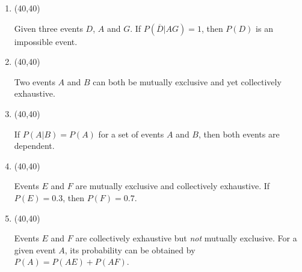 \documentclass[11pt,twoside]{article}
\numberwithin{equation}{section}
\newcommand{\?}{\stackrel{?}{=}}
\newcommand{\ol}{\overline}
\newcommand{\gr}{\color{green!40!black}}
\begin{document}
\begin{enumerate}[\bf (i)]
\item \hfill
  \begin{minipage}{.1\linewidth}
    \framebox(40,40){ \gr  }
  \end{minipage}\quad
  \begin{minipage}{.85\linewidth}
    Given three events $D$, $A$ and $G$. If $P(\ol{D}|AG) = 1$, then $P(D)$ is an impossible event.
 
  \end{minipage}

    \smallskip
  
\item \hfill
  \begin{minipage}{.1\linewidth}
    \framebox(40,40){\gr  }
  \end{minipage}\quad
  \begin{minipage}{.85\linewidth}
   Two events $A$ and $B$ can both be mutually exclusive and yet collectively exhaustive.
  \end{minipage}

  \smallskip
  
\item \hfill
  \begin{minipage}{.1\linewidth}
    \framebox(40,40){\gr  }
  \end{minipage}\quad
  \begin{minipage}{.85\linewidth}
    If $P(A|B) = P(A)$ for a set of events $A$ and $B$, then both events are  dependent.
  \end{minipage}

  \smallskip
  
\item \hfill
  \begin{minipage}{.1\linewidth}
    \framebox(40,40){\gr  }
  \end{minipage}\quad
  \begin{minipage}{.85\linewidth}
    Events $E$ and $F$ are mutually exclusive and collectively exhaustive. If $P(E) = 0.3$, then $P(F) = 0.7$.
   \end{minipage}

  \smallskip

  \item \hfill
  \begin{minipage}{.1\linewidth}
    \framebox(40,40){\gr  }
  \end{minipage}\quad
  \begin{minipage}{.85\linewidth}
    Events $E$ and $F$ are  collectively exhaustive but \textit{not} mutually exclusive.
    For a given event $A$, its probability can be obtained by $P(A) = P(AE) + P(AF)$.
  \end{minipage}
  

\end{enumerate}
\end{document}
